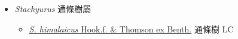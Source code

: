 
  \begin{itemize}
 \item[] \textit{Stachyurus} 通條樹屬
                    
  \begin{itemize}
        \item[] \href{http://www.theplantlist.org/tpl1.1/search?q=Stachyurus+himalaicus}{\textit{S. himalaicus} Hook.f. \& Thomson ex Benth.}   通條樹 LC
  \end{itemize}
  \end{itemize}
